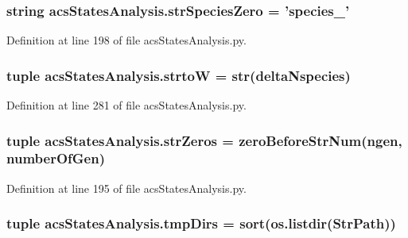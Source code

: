 \hypertarget{a00104_a52f7239b2be2cb978182547960b6c46e}{
\subsubsection[{str\-Species\-Zero}]{\setlength{\rightskip}{0pt plus 5cm}string acs\-States\-Analysis.\-str\-Species\-Zero = 'species\-\_\-'}}\label{a00104_a52f7239b2be2cb978182547960b6c46e}


Definition at line 198 of file acs\-States\-Analysis.\-py.

\hypertarget{a00104_abe05028c33fab522e3b940195eaaa586}{
\subsubsection[{strto\-W}]{\setlength{\rightskip}{0pt plus 5cm}tuple acs\-States\-Analysis.\-strto\-W = str({\bf delta\-Nspecies})}}\label{a00104_abe05028c33fab522e3b940195eaaa586}


Definition at line 281 of file acs\-States\-Analysis.\-py.

\hypertarget{a00104_a292c23aa303304f24632662a5dfbfa23}{
\subsubsection[{str\-Zeros}]{\setlength{\rightskip}{0pt plus 5cm}tuple acs\-States\-Analysis.\-str\-Zeros = {\bf zero\-Before\-Str\-Num}(ngen, {\bf number\-Of\-Gen})}}\label{a00104_a292c23aa303304f24632662a5dfbfa23}


Definition at line 195 of file acs\-States\-Analysis.\-py.

\hypertarget{a00104_ab71c19ee20acae0f07934a8d0e9fe50b}{
\subsubsection[{tmp\-Dirs}]{\setlength{\rightskip}{0pt plus 5cm}tuple acs\-States\-Analysis.\-tmp\-Dirs = sort(os.\-listdir({\bf Str\-Path}))}}\label{a00104_ab71c19ee20acae0f07934a8d0e9fe50b}


